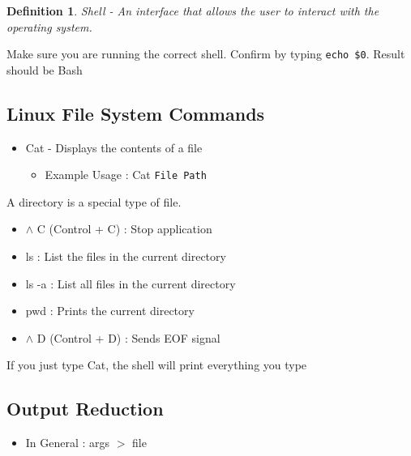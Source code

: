 \documentclass{article}
\newtheorem{definition}[theorem]{Definition}
\newenvironment{exblock}[1]{%
    \tcolorbox[beamer,%
    noparskip,breakable,
    colback=lightgreen,colframe=darkgreen,%
    colbacklower=limegreen!75!lightgreen,%
    title=#1]}%
    {\endtcolorbox}
\newenvironment{ablock}[1]{%
    \tcolorbox[beamer,%
    noparskip,breakable,
    colback=lightcoral,colframe=darkred,%
    colbacklower=tomato!75!lightcoral,%
    title=#1]}%
    {\endtcolorbox}
\begin{document}
\begin{definition}
Shell - An interface that allows the user to interact with the operating system. 
\end{definition}

\begin{ablock}{Note}
Make sure you are running the correct shell. Confirm by typing \verb|echo $0|. Result should be Bash
\end{ablock}

\subsection{Linux File System Commands}

\begin{itemize}
\item Cat - Displays the contents of a file
\begin{itemize}
\item Example Usage : Cat \verb|File Path|
\end{itemize} 
\end{itemize}

\begin{exblock}{Additional Information}
A directory is a special type of file.
\end{exblock}

\begin{itemize}
\item \(\wedge\) C (Control + C) : Stop application 
\item ls : List the files in the current directory 
\item ls -a : List all files in the current directory 
\item pwd : Prints the current directory 
\item \(\wedge\) D (Control + D) : Sends EOF signal 
\end{itemize}

\begin{exblock}{What happens if you just type cat?}
If you just type Cat, the shell will print everything you type
\end{exblock}

\subsection{Output Reduction}
\begin{itemize}
\item In General : args \(>\) file
\end{itemize}
\end{document}
